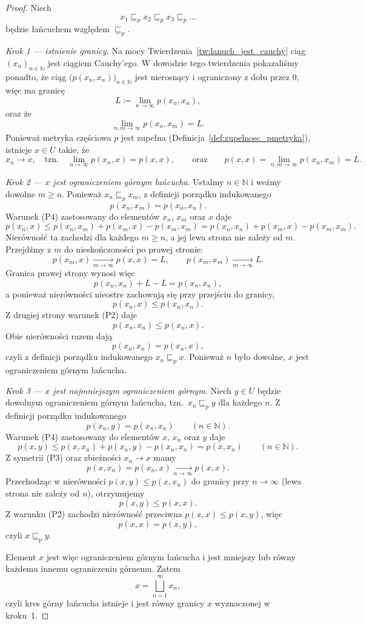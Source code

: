 \documentclass[11pt,a4paper]{article}
\theoremstyle{definition}
\theoremstyle{plain}
\begin{document}
\begin{proof}
	Niech
	\[
	x_1\sqsubseteq_p x_2\sqsubseteq_p x_3\sqsubseteq_p\ldots
	\]
	będzie łańcuchem względem $\sqsubseteq_p$.
	
	\emph{Krok 1 --- istnienie granicy.} Na mocy
	Twierdzenia~\ref{tw:lanuch_jest_cauchy} ciąg $(x_n)_{n\in\mathbb N}$
	jest ciągiem Cauchy'ego. W dowodzie tego twierdzenia pokazaliśmy
	ponadto, że ciąg $\big(p(x_n,x_n)\big)_{n\in\mathbb N}$ jest
	nierosnący i ograniczony z dołu przez $0$, więc ma granicę
	\[
	L\coloneqq\lim_{n\to\infty}p(x_n,x_n),
	\]
	oraz że
	\[
	\lim_{n,m\to\infty}p(x_n,x_m)=L.
	\]
	Ponieważ metryka częściowa $p$ jest zupełna
	(Definicja~\ref{def:zupelnosc_pmetryka}), istnieje $x\in U$ takie, że
	\[
	x_n\longrightarrow x,
	\quad\text{tzn.}\quad
	\lim_{n\to\infty}p(x_n,x)=p(x,x),
	\qquad\text{oraz}\qquad
	p(x,x)=\lim_{n,m\to\infty}p(x_n,x_m)=L.
	\]
	
	\emph{Krok 2 --- $x$ jest ograniczeniem górnym łańcucha.} Ustalmy
	$n\in\mathbb N$ i weźmy dowolne $m\geq n$. Ponieważ
	$x_n\sqsubseteq_p x_m$, z definicji porządku indukowanego
	\[
	p(x_n,x_m)=p(x_n,x_n).
	\]
	Warunek (P4) zastosowany do elementów $x_n$, $x_m$ oraz $x$ daje
	\[
	p(x_n,x)
	\leq
	p(x_n,x_m)+p(x_m,x)-p(x_m,x_m)
	=
	p(x_n,x_n)+p(x_m,x)-p(x_m,x_m).
	\]
	Nierówność ta zachodzi dla każdego $m\geq n$, a jej lewa strona nie
	zależy od $m$. Przejdźmy z $m$ do nieskończoności po prawej stronie:
	\[
	p(x_m,x)\xrightarrow[m\to\infty]{}p(x,x)=L,
	\qquad
	p(x_m,x_m)\xrightarrow[m\to\infty]{}L.
	\]
	Granica prawej strony wynosi więc
	\[
	p(x_n,x_n)+L-L=p(x_n,x_n),
	\]
	a ponieważ nierówności nieostre zachowują się przy przejściu do
	granicy,
	\[
	p(x_n,x)\leq p(x_n,x_n).
	\]
	Z drugiej strony warunek (P2) daje
	\[
	p(x_n,x_n)\leq p(x_n,x).
	\]
	Obie nierówności razem dają
	\[
	p(x_n,x_n)=p(x_n,x),
	\]
	czyli z definicji porządku indukowanego $x_n\sqsubseteq_p x$.
	Ponieważ $n$ było dowolne, $x$ jest ograniczeniem górnym łańcucha.
	
	\emph{Krok 3 --- $x$ jest najmniejszym ograniczeniem górnym.} Niech
	$y\in U$ będzie dowolnym ograniczeniem górnym łańcucha, tzn.\
	$x_n\sqsubseteq_p y$ dla każdego $n$. Z definicji porządku
	indukowanego
	\[
	p(x_n,y)=p(x_n,x_n)
	\qquad(n\in\mathbb N).
	\]
	Warunek (P4) zastosowany do elementów $x$, $x_n$ oraz $y$ daje
	\[
	p(x,y)
	\leq
	p(x,x_n)+p(x_n,y)-p(x_n,x_n)
	=
	p(x,x_n)
	\qquad(n\in\mathbb N).
	\]
	Z symetrii (P3) oraz zbieżności $x_n\to x$ mamy
	\[
	p(x,x_n)=p(x_n,x)\xrightarrow[n\to\infty]{}p(x,x).
	\]
	Przechodząc w nierówności $p(x,y)\leq p(x,x_n)$ do granicy przy
	$n\to\infty$ (lewa strona nie zależy od $n$), otrzymujemy
	\[
	p(x,y)\leq p(x,x).
	\]
	Z warunku (P2) zachodzi nierówność przeciwna $p(x,x)\leq p(x,y)$,
	więc
	\[
	p(x,x)=p(x,y),
	\]
	czyli $x\sqsubseteq_p y$.
	
	Element $x$ jest więc ograniczeniem górnym łańcucha i jest mniejszy
	lub równy każdemu innemu ograniczeniu górnemu. Zatem
	\[
	x=\bigsqcup_{n=1}^{\infty}x_n,
	\]
	czyli kres górny łańcucha istnieje i jest równy granicy $x$
	wyznaczonej w kroku~1.
\end{proof}
\end{document}

